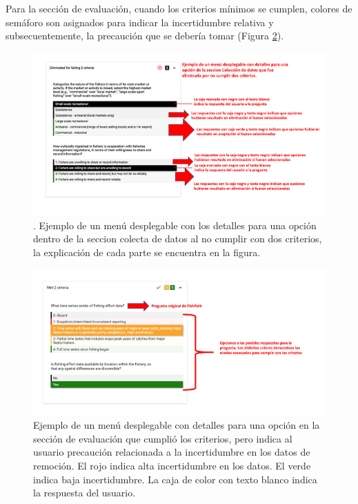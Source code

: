 \documentclass[
  11pt,
]{book}
\begin{document}
Para la sección de evaluación, cuando los criterios mínimos se cumplen, colores de semáforo son asignados para indicar la incertidumbre relativa y subsecuentemente, la precaución que se debería tomar (Figura \ref{fig:assessment-crit-drop-down}).

\begin{figure}

{\centering \includegraphics[width=0.75\linewidth]{images/crit-drop-down-es} 

}

\caption{. Ejemplo de un menú desplegable con los detalles para una opción dentro de la seccion colecta de datos al no cumplir con dos criterios, la explicación de cada parte se encuentra en la figura.}\label{fig:crit-drop-down}
\end{figure}

\begin{figure}

{\centering \includegraphics[width=0.75\linewidth]{images/assessment-crit-drop-down-es} 

}

\caption{Ejemplo de un menú desplegable con detalles para una opción en la sección de evaluación que cumplió los criterios, pero indica al usuario precaución relacionada a la incertidumbre en los datos de remoción. El rojo indica alta incertidumbre en los datos. El verde indica baja incertidumbre. La caja de color con texto blanco indica la respuesta del usuario.}\label{fig:assessment-crit-drop-down}
\end{figure}
\end{document}
